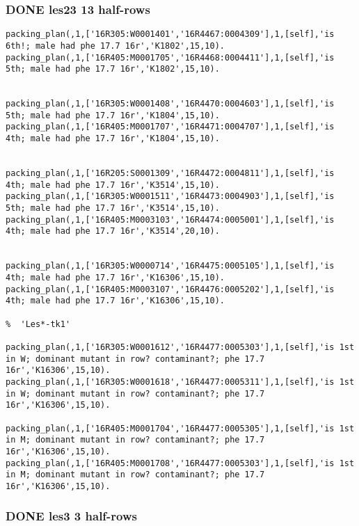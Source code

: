 \documentclass[11pt]{article}
\begin{document}
\subsubsection{{\bfseries\sffamily DONE} les23 13 half-rows}
\label{sec-4-3-1}

\begin{verbatim}
packing_plan(,1,['16R305:W0001401','16R4467:0004309'],1,[self],'is 6th!; male had phe 17.7 16r','K1802',15,10).
packing_plan(,1,['16R405:M0001705','16R4468:0004411'],1,[self],'is 5th; male had phe 17.7 16r','K1802',15,10).


packing_plan(,1,['16R305:W0001408','16R4470:0004603'],1,[self],'is 5th; male had phe 17.7 16r','K1804',15,10).
packing_plan(,1,['16R405:M0001707','16R4471:0004707'],1,[self],'is 4th; male had phe 17.7 16r','K1804',15,10).


packing_plan(,1,['16R205:S0001309','16R4472:0004811'],1,[self],'is 4th; male had phe 17.7 16r','K3514',15,10).
packing_plan(,1,['16R305:W0001511','16R4473:0004903'],1,[self],'is 5th; male had phe 17.7 16r','K3514',15,10).
packing_plan(,1,['16R405:M0003103','16R4474:0005001'],1,[self],'is 4th; male had phe 17.7 16r','K3514',20,10).


packing_plan(,1,['16R305:W0000714','16R4475:0005105'],1,[self],'is 4th; male had phe 17.7 16r','K16306',15,10).
packing_plan(,1,['16R405:M0003107','16R4476:0005202'],1,[self],'is 4th; male had phe 17.7 16r','K16306',15,10).

%  'Les*-tk1'  

packing_plan(,1,['16R305:W0001612','16R4477:0005303'],1,[self],'is 1st in W; dominant mutant in row? contaminant?; phe 17.7 16r','K16306',15,10).
packing_plan(,1,['16R305:W0001618','16R4477:0005311'],1,[self],'is 1st in W; dominant mutant in row? contaminant?; phe 17.7 16r','K16306',15,10).

packing_plan(,1,['16R405:M0001704','16R4477:0005305'],1,[self],'is 1st in M; dominant mutant in row? contaminant?; phe 17.7 16r','K16306',15,10).
packing_plan(,1,['16R405:M0001708','16R4477:0005303'],1,[self],'is 1st in M; dominant mutant in row? contaminant?; phe 17.7 16r','K16306',15,10).
\end{verbatim}



\subsubsection{{\bfseries\sffamily DONE} les3 3 half-rows}
\label{sec-4-3-2}
\end{document}
